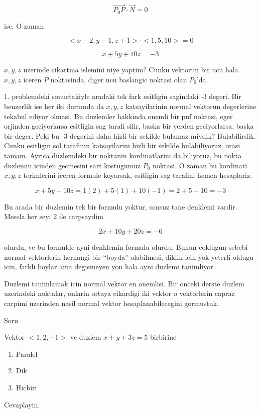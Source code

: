 \documentclass[12pt,fleqn]{article}
\begin{document}
\[ \vec{P_0P} \cdot \vec{N} = 0 \]

ise. O zaman 

\[ <x-2, y-1, z+1> \cdot <1,5,10> = 0 \]

\[ x+5y + 10z = -3 \]

$x,y,z$ uzerinde cikartma islemini niye yaptim? Cunku vektorun bir ucu hala
$x,y,z$ iceren $P$ noktasinda, diger ucu baslangic noktasi olan $P_0$'da.

1. problemdeki sonuctakiyle aradaki tek fark esitligin sagindaki -3
degeri. Bir benzerlik ise her iki durumda da $x,y,z$ katsayilarinin normal
vektorun degerlerine tekabul ediyor olmasi. Bu duzlemler hakkinda onemli
bir puf noktasi, eger orjinden geciyorlarsa esitligin sag tarafi sifir,
baska bir yerden geciyorlarsa, baska bir deger. Peki bu -3 degerini daha
hizli bir sekilde bulamaz miydik? Bulabilirdik. Cunku esitligin sol
tarafinin katsayilarini hizli bir sekilde bulabiliyoruz, orasi
tamam. Ayrica duzlemdeki bir noktanin kordinatlarini da biliyoruz, bu nokta
duzlemin icinden gecmesini sart kostugumuz $P_0$ noktasi. O zaman bu
kordinati $x,y,z$ terimlerini iceren formule koyarsak, esitligin sag
tarafini hemen hesaplariz. 

\[ x+5y + 10z = 1(2) + 5(1) + 10(-1) = 2 + 5 -10 = -3\]

Bu arada bir duzlemin tek bir formulu yoktur, sonsuz tane denklemi
vardir. Mesela her seyi 2 ile carpsaydim

\[ 2x+10y+20z = -6 \]

olurdu, ve bu formulde ayni denklemin formulu olurdu. Bunun coklugun sebebi
normal vektorlerin herhangi bir ``boyda'' olabilmesi, diklik icin yok
yeterli oldugu icin, farkli boylar ama degismeyen yon hala ayni duzlemi
tanimliyor. 

Duzlemi tanimlamak icin normal vektor en onemlisi. Bir onceki derste duzlem
uzerindeki noktalar, onlarin ortaya cikardigi iki vektor o vektorlerin capraz
carpimi uzerinden nasil normal vektor hesaplanabilecegini gormustuk.

Soru

Vektor $<1,2,-1>$ ve duzlem $x+y+3z = 5$ birbirine

\begin{enumerate}
   \item Paralel
   \item Dik
   \item Hicbiri
\end{enumerate}

Cevaplayin. 
\end{document}
